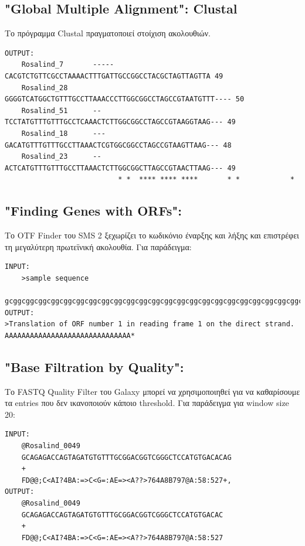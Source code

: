     \subsection{"Global Multiple Alignment": Clustal}
        Το πρόγραμμα Clustal πραγματοποιεί στοίχιση ακολουθιών.
    \begin{graycomment} \footnotesize
    \begin{verbatim}
OUTPUT:
    Rosalind_7       -----CACGTCTGTTCGCCTAAAACTTTGATTGCCGGCCTACGCTAGTTAGTTA	49
    Rosalind_28      GGGGTCATGGCTGTTTGCCTTAAACCCTTGGCGGCCTAGCCGTAATGTTT----	50
    Rosalind_51      --TCCTATGTTTGTTTGCCTCAAACTCTTGGCGGCCTAGCCGTAAGGTAAG---	49
    Rosalind_18      ---GACATGTTTGTTTGCCTTAAACTCGTGGCGGCCTAGCCGTAAGTTAAG---	48
    Rosalind_23      --ACTCATGTTTGTTTGCCTTAAACTCTTGGCGGCTTAGCCGTAACTTAAG---	49
                           * *  **** **** ****       * *            *\end{verbatim}
    \end{graycomment}

    \subsection{"Finding Genes with ORFs": }
        Το OTF Finder του SMS 2 ξεχωρίζει το κωδικόνιο έναρξης και λήξης και επιστρέφει τη μεγαλύτερη πρωτεϊνική ακολουθία. Για παράδειγμα:
\begin{graycomment} \footnotesize
    \begin{verbatim}
INPUT:
    >sample sequence
    gcggcggcggcggcggcggcggcggcggcggcggcggcggcggcggcggcggcggcggcggcggcggcggcggcggcg...
OUTPUT:
>Translation of ORF number 1 in reading frame 1 on the direct strand.
AAAAAAAAAAAAAAAAAAAAAAAAAAAAAA*\end{verbatim}
\end{graycomment}

    \subsection{"Base Filtration by Quality": }
        Το FASTQ Quality Filter του Galaxy μπορεί να χρησιμοποιηθεί για να καθαρίσουμε τα entries που δεν ικανοποιούν κάποιο threshold.
        Για παράδειγμα για window size 20:
    \begin{graycomment} \footnotesize
    \begin{verbatim}
INPUT:
    @Rosalind_0049
    GCAGAGACCAGTAGATGTGTTTGCGGACGGTCGGGCTCCATGTGACACAG
    +
    FD@@;C<AI?4BA:=>C<G=:AE=><A??>764A8B797@A:58:527+,
OUTPUT:
    @Rosalind_0049
    GCAGAGACCAGTAGATGTGTTTGCGGACGGTCGGGCTCCATGTGACAC
    +
    FD@@;C<AI?4BA:=>C<G=:AE=><A??>764A8B797@A:58:527\end{verbatim}
    \end{graycomment}


